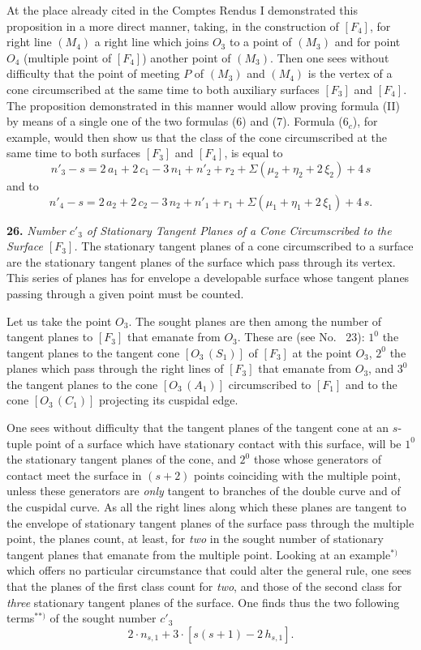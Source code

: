 \documentclass{article}
\begin{document}
At the place already cited in the Comptes Rendus I demonstrated this proposition in a more direct manner, taking, in the construction of $[F_4]$, for right line $(M_4)$ a right line which joins $O_3$ to a point of $(M_3)$ and for point $O_4$ (multiple point of $[F_4]$) another point of $(M_3)$. Then one sees without difficulty that the point of meeting $P$ of $(M_3)$ and $(M_4)$ is the vertex of a cone circumscribed at the same time to both auxiliary surfaces $[F_3]$ and $[F_4]$. The proposition demonstrated in this manner would allow proving formula (II) by means of a single one of the two formulas (6) and (7). Formula ($6_c$), for example, would then show us that the class of the cone circumscribed at the same time to both surfaces $[F_3]$ and $[F_4]$, is equal to
\[
n'_3 - s = 2\,a_1 + 2\,c_1 - 3\,n_1 + n'_2 + r_2 + \Sigma(\mu_2 + \eta_2 + 2\,\xi_2) + 4\,s
\]
and to
\[
n'_4 - s = 2\,a_2 + 2\,c_2 - 3\,n_2 + n'_1 + r_1 + \Sigma(\mu_1 + \eta_1 + 2\,\xi_1) + 4\,s.
\]

\textbf{26.} \emph{Number $c'_3$ of Stationary Tangent Planes of a Cone Circumscribed to the Surface $[F_3]$.} The stationary tangent planes of a cone circumscribed to a surface are the stationary tangent planes of the surface which pass through its vertex. This series of planes has for envelope a developable surface whose tangent planes passing through a given point must be counted.

Let us take the point $O_3$. The sought planes are then among the number of tangent planes to $[F_3]$ that emanate from $O_3$. These are (see No.~ 23): $1^0$ the tangent planes to the tangent cone $[O_3\,(S_1)]$ of $[F_3]$ at the point $O_3$, $2^0$ the planes which pass through the right lines of $[F_3]$ that emanate from $O_3$, and $3^0$ the tangent planes to the cone $[O_3\,(A_1)]$ circumscribed to $[F_1]$ and to the cone $[O_3\,(C_1)]$ projecting its cuspidal edge.

One sees without difficulty that the tangent planes of the tangent cone at an $s$-tuple point of a surface which have stationary contact with this surface, will be $1^0$ the stationary tangent planes of the cone, and $2^0$ those whose generators of contact meet the surface in $(s + 2)$ points coinciding with the multiple point, unless these generators are \emph{only} tangent to branches of the double curve and of the cuspidal curve. As all the right lines along which these planes are tangent to the envelope of stationary tangent planes of the surface pass through the multiple point, the planes count, at least, for \emph{two} in the sought number of stationary tangent planes that emanate from the multiple point. Looking at an example${}^{*)}$ which offers no particular circumstance that could alter the general rule, one sees that the planes of the first class count for \emph{two}, and those of the second class for \emph{three} stationary tangent planes of the surface. One finds thus the two following terms${}^{**)}$ of the sought number $c'_3$
\[
2\cdot n_{s, 1} + 3\cdot [s(s + 1) - 2\,h_{s, 1}].
\]
\end{document}
